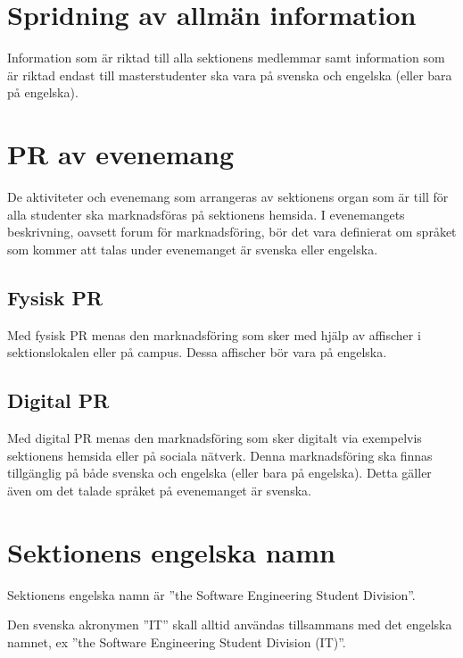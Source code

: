 \documentclass[11pt, includeaddress]{classes/cthit}
\begin{document}
\section{Spridning av allmän information}
Information som är riktad till alla sektionens medlemmar samt information som är riktad endast till masterstudenter ska vara på svenska och engelska (eller bara på engelska).

\newpage

\section{PR av evenemang}
De aktiviteter och evenemang som arrangeras av sektionens organ som är till för alla studenter ska marknadsföras på sektionens hemsida. I evenemangets beskrivning, oavsett forum för marknadsföring, bör det vara definierat om språket som kommer att talas under evenemanget är svenska eller engelska.

\subsection*{Fysisk PR}
Med fysisk PR menas den marknadsföring som sker med hjälp av affischer i sektionslokalen eller på campus. Dessa affischer bör vara på engelska.
\subsection*{Digital PR}
Med digital PR menas den marknadsföring som sker digitalt via exempelvis sektionens hemsida eller på sociala nätverk. Denna marknadsföring ska finnas tillgänglig på både svenska och engelska (eller bara på engelska). Detta gäller även om det talade språket på evenemanget är svenska.

\section{Sektionens engelska namn}
Sektionens engelska namn är ''the Software Engineering Student Division''.

Den svenska akronymen ''IT'' skall alltid användas tillsammans med det engelska namnet, ex ''the Software Engineering Student Division (IT)''.
\end{document}
